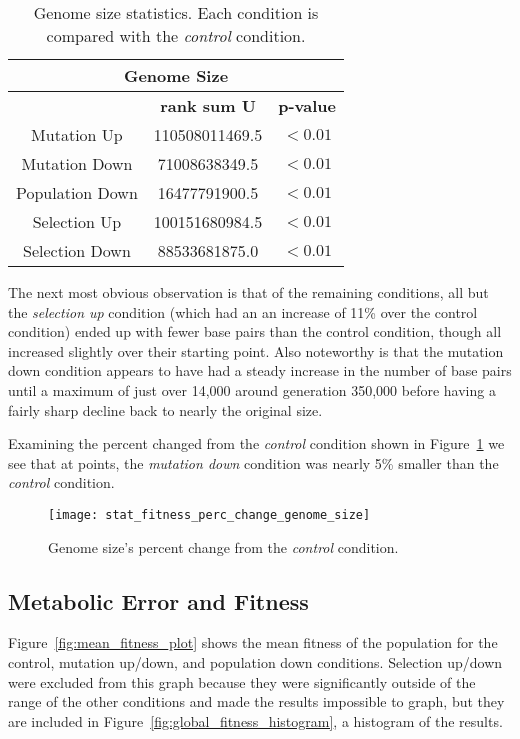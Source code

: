 \begin{table}[H]
	\centering
	\begin{tabular}{|c|c|c|}
		\hline
		\multicolumn{3}{c}{\Large Genome Size} \\
		\hline
		 & \textbf{rank sum U} & \textbf{p-value} \\
		\hline \hline
		Mutation Up & 110508011469.5 & $< 0.01$ \\
		\hline
		Mutation Down & 71008638349.5 & $< 0.01$ \\
		\hline
		Population Down & 16477791900.5 & $< 0.01$ \\
		\hline
		Selection Up & 100151680984.5 & $< 0.01$ \\
		\hline
		Selection Down & 88533681875.0 & $< 0.01$ \\
		\hline
	\end{tabular}
	\caption[Genome size statistics]{Genome size statistics. Each condition is compared with the \textit{control} condition.}
	\label{table:genome_size_stats}
\end{table} 

The next most obvious observation is that of the remaining conditions, all but the \textit{selection up} condition (which had an an increase of 11\% over the control condition) ended up with fewer base pairs than the control condition, though all increased slightly over their starting point. Also noteworthy is that the mutation down condition appears to have had a steady increase in the number of base pairs until a maximum of just over 14,000 around generation 350,000 before having a fairly sharp decline back to nearly the original size. 

Examining the percent changed from the \textit{control} condition shown in Figure~\ref{fig:genome_size_percent_change} we see that at points, the \textit{mutation down} condition was nearly 5\% smaller than the \textit{control} condition. 

\begin{figure}[H]
	\centering
	\texttt{[image: stat\_fitness\_perc\_change\_genome\_size]}
	\caption[Genome size - percent change]{Genome size's percent change from the \textit{control} condition.}
	\label{fig:genome_size_percent_change}
\end{figure}


\subsection{Metabolic Error and Fitness}
Figure~\ref{fig:mean_fitness_plot} shows the mean fitness of the population for the control, mutation up/down, and population down conditions. Selection up/down were excluded from this graph because they were significantly outside of the range of the other conditions and made the results impossible to graph, but they are included in Figure~\ref{fig:global_fitness_histogram}, a histogram of the results.

